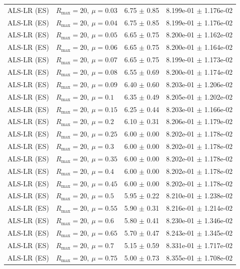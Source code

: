 \begin{table}[t]
\begin{tabular}{@{}llcc@{}}
ALS-LR (ES) & \(R_{\max}=20,\ \mu=0.03\) & 6.75 $\pm$ 0.85 & 8.199e-01 $\pm$ 1.176e-02 \\
ALS-LR (ES) & \(R_{\max}=20,\ \mu=0.04\) & 6.75 $\pm$ 0.85 & 8.199e-01 $\pm$ 1.176e-02 \\
ALS-LR (ES) & \(R_{\max}=20,\ \mu=0.05\) & 6.65 $\pm$ 0.75 & 8.200e-01 $\pm$ 1.162e-02 \\
ALS-LR (ES) & \(R_{\max}=20,\ \mu=0.06\) & 6.65 $\pm$ 0.75 & 8.200e-01 $\pm$ 1.164e-02 \\
ALS-LR (ES) & \(R_{\max}=20,\ \mu=0.07\) & 6.65 $\pm$ 0.75 & 8.199e-01 $\pm$ 1.173e-02 \\
ALS-LR (ES) & \(R_{\max}=20,\ \mu=0.08\) & 6.55 $\pm$ 0.69 & 8.200e-01 $\pm$ 1.174e-02 \\
ALS-LR (ES) & \(R_{\max}=20,\ \mu=0.09\) & 6.40 $\pm$ 0.60 & 8.203e-01 $\pm$ 1.206e-02 \\
ALS-LR (ES) & \(R_{\max}=20,\ \mu=0.1\) & 6.35 $\pm$ 0.49 & 8.205e-01 $\pm$ 1.202e-02 \\
ALS-LR (ES) & \(R_{\max}=20,\ \mu=0.15\) & 6.25 $\pm$ 0.44 & 8.203e-01 $\pm$ 1.166e-02 \\
ALS-LR (ES) & \(R_{\max}=20,\ \mu=0.2\) & 6.10 $\pm$ 0.31 & 8.206e-01 $\pm$ 1.179e-02 \\
ALS-LR (ES) & \(R_{\max}=20,\ \mu=0.25\) & 6.00 $\pm$ 0.00 & 8.202e-01 $\pm$ 1.178e-02 \\
ALS-LR (ES) & \(R_{\max}=20,\ \mu=0.3\) & 6.00 $\pm$ 0.00 & 8.202e-01 $\pm$ 1.178e-02 \\
ALS-LR (ES) & \(R_{\max}=20,\ \mu=0.35\) & 6.00 $\pm$ 0.00 & 8.202e-01 $\pm$ 1.178e-02 \\
ALS-LR (ES) & \(R_{\max}=20,\ \mu=0.4\) & 6.00 $\pm$ 0.00 & 8.202e-01 $\pm$ 1.178e-02 \\
ALS-LR (ES) & \(R_{\max}=20,\ \mu=0.45\) & 6.00 $\pm$ 0.00 & 8.202e-01 $\pm$ 1.178e-02 \\
ALS-LR (ES) & \(R_{\max}=20,\ \mu=0.5\) & 5.95 $\pm$ 0.22 & 8.210e-01 $\pm$ 1.238e-02 \\
ALS-LR (ES) & \(R_{\max}=20,\ \mu=0.55\) & 5.90 $\pm$ 0.31 & 8.216e-01 $\pm$ 1.214e-02 \\
ALS-LR (ES) & \(R_{\max}=20,\ \mu=0.6\) & 5.80 $\pm$ 0.41 & 8.230e-01 $\pm$ 1.346e-02 \\
ALS-LR (ES) & \(R_{\max}=20,\ \mu=0.65\) & 5.70 $\pm$ 0.47 & 8.243e-01 $\pm$ 1.345e-02 \\
ALS-LR (ES) & \(R_{\max}=20,\ \mu=0.7\) & 5.15 $\pm$ 0.59 & 8.331e-01 $\pm$ 1.717e-02 \\
ALS-LR (ES) & \(R_{\max}=20,\ \mu=0.75\) & 5.00 $\pm$ 0.73 & 8.355e-01 $\pm$ 1.708e-02 \\

\end{tabular}
\end{table}
